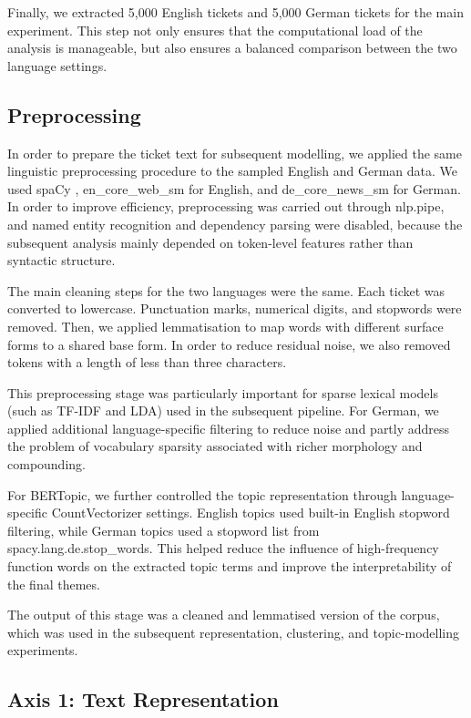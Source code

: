 \documentclass[11pt]{article}
\begin{document}
Finally, we extracted 5,000 English tickets and 5,000 German tickets for the main experiment. This step not only ensures that the computational load of the analysis is manageable, but also ensures a balanced comparison between the two language settings.

\subsection{Preprocessing}

In order to prepare the ticket text for subsequent modelling, we applied the same linguistic preprocessing procedure to the sampled English and German data. We used spaCy \citep{honnibal2020spacy}, en\_core\_web\_sm for English, and de\_core\_news\_sm for German. In order to improve efficiency, preprocessing was carried out through nlp.pipe, and named entity recognition and dependency parsing were disabled, because the subsequent analysis mainly depended on token-level features rather than syntactic structure.

The main cleaning steps for the two languages were the same. Each ticket was converted to lowercase. Punctuation marks, numerical digits, and stopwords were removed. Then, we applied lemmatisation to map words with different surface forms to a shared base form. In order to reduce residual noise, we also removed tokens with a length of less than three characters.

This preprocessing stage was particularly important for sparse lexical models (such as TF-IDF and LDA) used in the subsequent pipeline. For German, we applied additional language-specific filtering to reduce noise and partly address the problem of vocabulary sparsity associated with richer morphology and compounding.

For BERTopic, we further controlled the topic representation through language-specific CountVectorizer settings. English topics used built-in English stopword filtering, while German topics used a stopword list from spacy.lang.de.stop\_words. This helped reduce the influence of high-frequency function words on the extracted topic terms and improve the interpretability of the final themes.

The output of this stage was a cleaned and lemmatised version of the corpus, which was used in the subsequent representation, clustering, and topic-modelling experiments.

\subsection{Axis 1: Text Representation}
\end{document}
